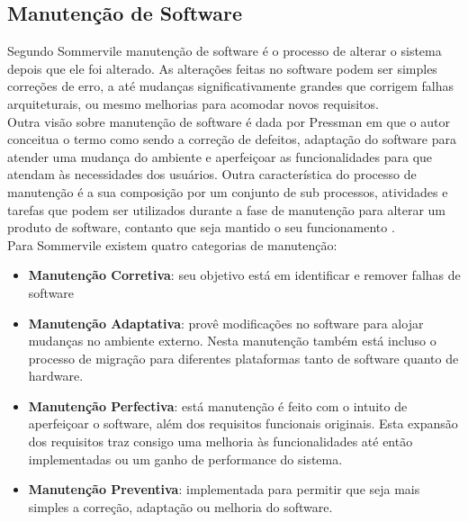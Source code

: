 \subsection{Manutenção de Software}
Segundo Sommervile \cite{sommervile} manutenção de software é o processo de alterar o sistema depois que ele foi alterado. As alterações feitas no software podem ser simples correções de erro, a até mudanças significativamente grandes que corrigem falhas arquiteturais, ou mesmo melhorias para acomodar novos requisitos.
\\Outra visão sobre manutenção de software é dada por Pressman \cite{pressman} em que o autor conceitua o termo como sendo a correção de defeitos, adaptação do software para atender uma mudança do ambiente e aperfeiçoar as funcionalidades para que atendam às necessidades dos usuários. Outra característica do processo de manutenção é a sua composição por um conjunto de sub processos, atividades e tarefas que podem ser utilizados durante a fase de manutenção para alterar um produto de software, contanto que seja mantido o seu funcionamento \cite{calazans_avaliacao_2005}.
\\Para Sommervile existem quatro categorias de manutenção:
\begin{itemize}
\item \textbf{Manutenção Corretiva}: seu objetivo está em identificar e remover falhas de software
\item \textbf{Manutenção Adaptativa}: provê modificações no software para alojar mudanças no ambiente externo. Nesta manutenção também está incluso o processo de migração para diferentes plataformas tanto de software quanto de hardware.
\item \textbf{Manutenção Perfectiva}: está manutenção é feito com o intuito de aperfeiçoar o software, além dos requisitos funcionais originais. Esta expansão dos requisitos traz consigo uma melhoria às funcionalidades até então implementadas ou um ganho de performance do sistema.
\item \textbf{Manutenção Preventiva}: implementada para permitir que seja mais simples a correção, adaptação ou melhoria do software.
\end{itemize}
